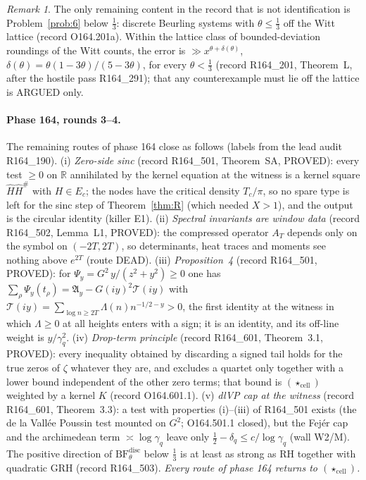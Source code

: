 \documentclass[11pt]{amsart}
\theoremstyle{definition}
\theoremstyle{remark}
\newtheorem{remark}[theorem]{Remark}
\begin{document}
\begin{remark}\label{rem:onlynonident}
The only remaining content in the record that is not identification is Problem~\ref{prob:6} below $\frac13$: discrete Beurling
systems with $\theta\le\frac13$ off the Witt lattice (record O164.201a). Within the lattice class of bounded-deviation roundings of
the Witt counts, the error is $\gg x^{\theta+\delta(\theta)}$, $\delta(\theta)=\theta(1-3\theta)/(5-3\theta)$, for every
$\theta<\frac13$ (record R164\_201, Theorem~L, after the hostile pass R164\_291); that any counterexample must lie off the
lattice is ARGUED only.
\end{remark}

\paragraph{Phase 164, rounds 3--4.} The remaining routes of phase 164 close as follows (labels from the lead audit R164\_190).
(i) \emph{Zero-side sinc} (record R164\_501, Theorem~SA, PROVED): every test $\ge0$ on $\mathbb R$ annihilated by the kernel
equation at the witness is a kernel square $\widehat H\widehat H^{\#}$ with $H\in E_c$; the nodes have the critical density
$T_c/\pi$, so no spare type is left for the sinc step of Theorem~\ref{thm:R} (which needed $X>1$), and the output is the circular
identity (killer E1). (ii) \emph{Spectral invariants are window data} (record R164\_502, Lemma~L1, PROVED): the compressed operator
$A_T$ depends only on the symbol on $(-2T,2T)$, so determinants, heat traces and moments see nothing above $e^{2T}$ (route DEAD).
(iii) \emph{Proposition~4} (record R164\_501, PROVED): for $\Psi_y=G^2\,y/(z^2+y^2)\ge0$ one has
$\sum_\rho\Psi_y(t_\rho)=\mathfrak A_y-G(iy)^2\mathcal T(iy)$ with $\mathcal T(iy)=\sum_{\log n\ge2T}\Lambda(n)n^{-1/2-y}>0$, the
first identity at the witness in which $\Lambda\ge0$ at all heights enters with a sign; it is an identity, and its off-line weight
is $y/\gamma_q^2$. (iv) \emph{Drop-term principle} (record R164\_601, Theorem~3.1, PROVED): every inequality obtained by discarding
a signed tail holds for the true zeros of $\zeta$ whatever they are, and excludes a quartet only together with a lower bound
independent of the other zero terms; that bound is $(\star_{\mathrm{cell}})$ weighted by a kernel $K$ (record O164.601.1).
(v) \emph{dlVP cap at the witness} (record R164\_601, Theorem~3.3): a test with properties (i)--(iii) of R164\_501 exists (the de la
Vall\'ee Poussin test mounted on $G^2$; O164.501.1 closed), but the Fej\'er cap and the archimedean term $\asymp\log\gamma_q$ leave
only $\frac12-\delta_q\le c/\log\gamma_q$ (wall W2/M). The positive direction of $\mathrm{BF}^{\mathrm{disc}}_\theta$ below $\frac13$
is at least as strong as RH together with quadratic GRH (record R164\_503). \emph{Every route of phase 164 returns to
$(\star_{\mathrm{cell}})$.}
\end{document}
